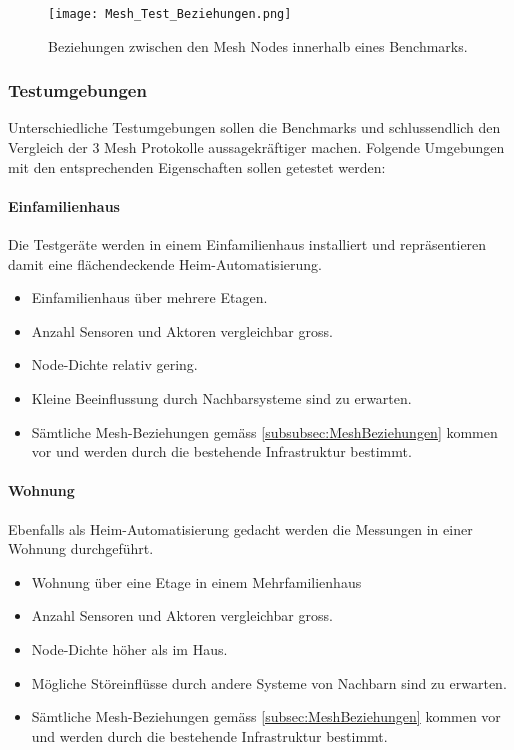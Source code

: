 \begin{figure}[H]
	\centering
	\texttt{[image: Mesh\_Test\_Beziehungen.png]}
	\caption{Beziehungen zwischen den Mesh Nodes innerhalb eines Benchmarks.}\label{fig:MeshTestBeziehungen}
\end{figure}


\subsubsection{Testumgebungen}\label{subsubsec:Testumgebungen}

Unterschiedliche Testumgebungen sollen die Benchmarks und schlussendlich den Vergleich der 3 Mesh Protokolle aussagekräftiger machen.
Folgende Umgebungen mit den entsprechenden Eigenschaften sollen getestet werden:


\paragraph{Einfamilienhaus}
Die Testgeräte werden in einem Einfamilienhaus installiert und repräsentieren damit eine flächendeckende Heim-Automatisierung.
\begin{itemize}
	\item Einfamilienhaus über mehrere Etagen.
	\item Anzahl Sensoren und Aktoren vergleichbar gross.
	\item Node-Dichte relativ gering.
	\item Kleine Beeinflussung durch Nachbarsysteme sind zu erwarten.
	\item Sämtliche Mesh-Beziehungen gemäss \ref{subsubsec:MeshBeziehungen} kommen vor und werden durch die bestehende Infrastruktur bestimmt.
\end{itemize}
	
\paragraph{Wohnung}
Ebenfalls als Heim-Automatisierung gedacht werden die Messungen in einer Wohnung durchgeführt.
\begin{itemize}
	\item Wohnung über eine Etage in einem Mehrfamilienhaus
	\item Anzahl Sensoren und Aktoren vergleichbar gross.
	\item Node-Dichte höher als im Haus.
	\item Mögliche Störeinflüsse durch andere Systeme von Nachbarn sind zu erwarten.
	\item Sämtliche Mesh-Beziehungen gemäss \ref{subsec:MeshBeziehungen} kommen vor und werden durch die bestehende Infrastruktur bestimmt.
\end{itemize}

